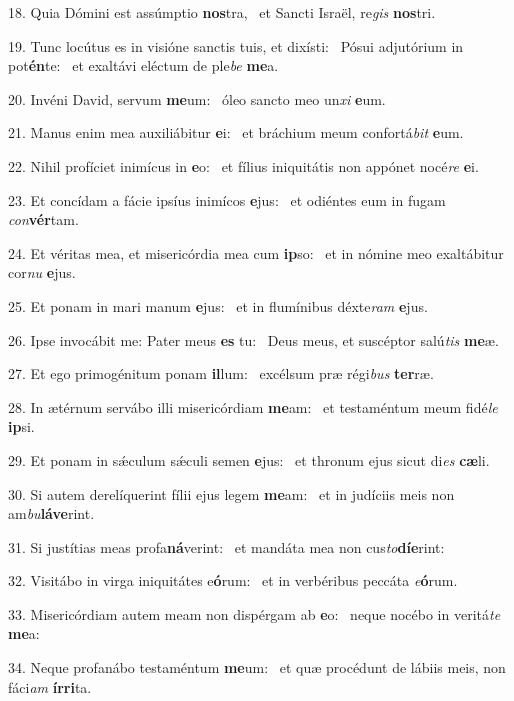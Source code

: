 18. Quia Dómini est assúmptio \textbf{nos}tra, \ast\  et Sancti Israël, re\textit{gis} \textbf{nos}tri.\

19. Tunc locútus es in visióne sanctis tuis, et dixísti: \dag\  Pósui adjutórium in pot\textbf{én}te: \ast\  et exaltávi eléctum de ple\textit{be} \textbf{me}a.\

20. Invéni David, servum \textbf{me}um: \ast\  óleo sancto meo un\textit{xi} \textbf{e}um.\

21. Manus enim mea auxiliábitur \textbf{e}i: \ast\  et bráchium meum confortá\textit{bit} \textbf{e}um.\

22. Nihil profíciet inimícus in \textbf{e}o: \ast\  et fílius iniquitátis non appónet nocé\textit{re} \textbf{e}i.\

23. Et concídam a fácie ipsíus inimícos \textbf{e}jus: \ast\  et odiéntes eum in fugam \textit{con}\textbf{vér}tam.\

24. Et véritas mea, et misericórdia mea cum \textbf{ip}so: \ast\  et in nómine meo exaltábitur cor\textit{nu} \textbf{e}jus.\

25. Et ponam in mari manum \textbf{e}jus: \ast\  et in flumínibus déxte\textit{ram} \textbf{e}jus.\

26. Ipse invocábit me: Pater meus \textbf{es} tu: \ast\  Deus meus, et suscéptor salú\textit{tis} \textbf{me}æ.\

27. Et ego primogénitum ponam \textbf{il}lum: \ast\  excélsum præ régi\textit{bus} \textbf{ter}ræ.\

28. In ætérnum servábo illi misericórdiam \textbf{me}am: \ast\  et testaméntum meum fidé\textit{le} \textbf{ip}si.\

29. Et ponam in sǽculum sǽculi semen \textbf{e}jus: \ast\  et thronum ejus sicut di\textit{es} \textbf{cæ}li.\

30. Si autem derelíquerint fílii ejus legem \textbf{me}am: \ast\  et in judíciis meis non am\textit{bu}\textbf{lá}\textbf{ve}rint.\

31. Si justítias meas profa\textbf{ná}verint: \ast\  et mandáta mea non cus\textit{to}\textbf{dí}\textbf{e}rint:\

32. Visitábo in virga iniquitátes e\textbf{ó}rum: \ast\  et in verbéribus peccáta \textit{e}\textbf{ó}rum.\

33. Misericórdiam autem meam non dispérgam ab \textbf{e}o: \ast\  neque nocébo in veritá\textit{te} \textbf{me}a:\

34. Neque profanábo testaméntum \textbf{me}um: \ast\  et quæ procédunt de lábiis meis, non fáci\textit{am} \textbf{ír}\textbf{ri}ta.\

